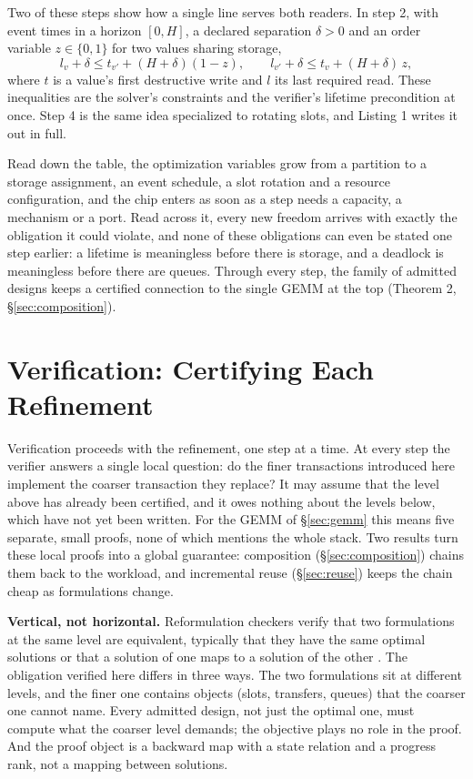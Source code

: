 \documentclass[11pt]{article}
\begin{document}
Two of these steps show how a single line serves both readers. In step 2, with event times in a horizon \([0,H]\), a declared separation \(\delta>0\) and an order variable \(z\in\{0,1\}\) for two values sharing storage,
\[
l_v+\delta\le t_{v'}+(H+\delta)(1-z),\qquad l_{v'}+\delta\le t_v+(H+\delta)\,z,
\]
where \(t\) is a value's first destructive write and \(l\) its last required read. These inequalities are the solver's constraints and the verifier's lifetime precondition at once. Step 4 is the same idea specialized to rotating slots, and Listing 1 writes it out in full.

Read down the table, the optimization variables grow from a partition to a storage assignment, an event schedule, a slot rotation and a resource configuration, and the chip enters as soon as a step needs a capacity, a mechanism or a port. Read across it, every new freedom arrives with exactly the obligation it could violate, and none of these obligations can even be stated one step earlier: a lifetime is meaningless before there is storage, and a deadlock is meaningless before there are queues. Through every step, the family of admitted designs keeps a certified connection to the single GEMM at the top (Theorem 2, §\ref{sec:composition}).

\section{Verification: Certifying Each Refinement}\label{sec:verification}

Verification proceeds with the refinement, one step at a time. At every step the verifier answers a single local question: do the finer transactions introduced here implement the coarser transaction they replace? It may assume that the level above has already been certified, and it owes nothing about the levels below, which have not yet been written. For the GEMM of §\ref{sec:gemm} this means five separate, small proofs, none of which mentions the whole stack. Two results turn these local proofs into a global guarantee: composition (§\ref{sec:composition}) chains them back to the workload, and incremental reuse (§\ref{sec:reuse}) keeps the chain cheap as formulations change.

\textbf{Vertical, not horizontal.} Reformulation checkers verify that two formulations at the same level are equivalent, typically that they have the same optimal solutions or that a solution of one maps to a solution of the other \cite{r11,r13,r14}. The obligation verified here differs in three ways. The two formulations sit at different levels, and the finer one contains objects (slots, transfers, queues) that the coarser one cannot name. Every admitted design, not just the optimal one, must compute what the coarser level demands; the objective plays no role in the proof. And the proof object is a backward map with a state relation and a progress rank, not a mapping between solutions.
\end{document}

